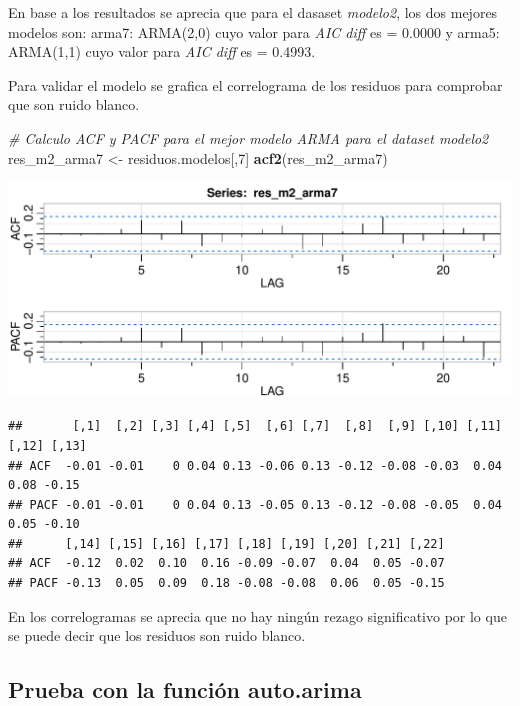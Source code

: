 \documentclass[
  11pt,
]{article}
\newenvironment{Shaded}{\begin{snugshade}}{\end{snugshade}}
\newcommand{\CommentTok}[1]{\textcolor[rgb]{0.56,0.35,0.01}{\textit{#1}}}
\newcommand{\DecValTok}[1]{\textcolor[rgb]{0.00,0.00,0.81}{#1}}
\newcommand{\KeywordTok}[1]{\textcolor[rgb]{0.13,0.29,0.53}{\textbf{#1}}}
\newcommand{\NormalTok}[1]{#1}
\newcommand{\StringTok}[1]{\textcolor[rgb]{0.31,0.60,0.02}{#1}}
\begin{document}
En base a los resultados se aprecia que para el dasaset \emph{modelo2},
los dos mejores modelos son: arma7: ARMA(2,0) cuyo valor para \emph{AIC
diff} es = 0.0000 y arma5: ARMA(1,1) cuyo valor para \emph{AIC diff} es
= 0.4993.

Para validar el modelo se grafica el correlograma de los residuos para
comprobar que son ruido blanco.

\begin{Shaded}
\begin{Highlighting}[]
\CommentTok{# Calculo ACF y PACF para el mejor modelo ARMA para el dataset modelo2}
\NormalTok{res_m2_arma7 <-}\StringTok{ }\NormalTok{residuos.modelos[,}\DecValTok{7}\NormalTok{]}
\KeywordTok{acf2}\NormalTok{(res_m2_arma7)}
\end{Highlighting}
\end{Shaded}

\begin{center}\includegraphics[width=0.9\linewidth]{RmdFigs/acf2_arma7-1} \end{center}

\begin{verbatim}
##       [,1]  [,2] [,3] [,4] [,5]  [,6] [,7]  [,8]  [,9] [,10] [,11] [,12] [,13]
## ACF  -0.01 -0.01    0 0.04 0.13 -0.06 0.13 -0.12 -0.08 -0.03  0.04  0.08 -0.15
## PACF -0.01 -0.01    0 0.04 0.13 -0.05 0.13 -0.12 -0.08 -0.05  0.04  0.05 -0.10
##      [,14] [,15] [,16] [,17] [,18] [,19] [,20] [,21] [,22]
## ACF  -0.12  0.02  0.10  0.16 -0.09 -0.07  0.04  0.05 -0.07
## PACF -0.13  0.05  0.09  0.18 -0.08 -0.08  0.06  0.05 -0.15
\end{verbatim}

En los correlogramas se aprecia que no hay ningún rezago significativo
por lo que se puede decir que los residuos son ruido blanco.

\hypertarget{prueba-con-la-funciuxf3n-auto.arima}{%
\subsection{Prueba con la función
auto.arima}\label{prueba-con-la-funciuxf3n-auto.arima}}
\end{document}
